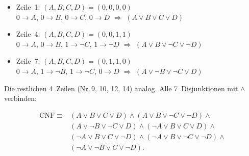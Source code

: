 \documentclass[a4paper,12pt]{article}
\begin{document}
\begin{itemize}[nosep]
\item Zeile~1: $(A,B,C,D) = (0,0,0,0)$\\
      $0 \to A$,\; $0 \to B$,\;
      $0 \to C$,\; $0 \to D$
      \;$\Rightarrow$\; $(A \vee B \vee C \vee D)$
\item Zeile~4: $(A,B,C,D) = (0,0,1,1)$\\
      $0 \to A$,\; $0 \to B$,\;
      $1 \to \neg C$,\; $1 \to \neg D$
      \;$\Rightarrow$\; $(A \vee B \vee \neg C \vee \neg D)$
\item Zeile~7: $(A,B,C,D) = (0,1,1,0)$\\
      $0 \to A$,\; $1 \to \neg B$,\;
      $1 \to \neg C$,\; $0 \to D$
      \;$\Rightarrow$\; $(A \vee \neg B \vee \neg C \vee D)$
\end{itemize}

Die restlichen 4~Zeilen (Nr.\,9, 10, 12, 14) analog.
Alle 7~Disjunktionen mit $\wedge$ verbinden:

\begin{align*}
\text{CNF} \;\equiv\; &(A \vee B \vee C \vee D) \wedge
(A \vee B \vee \neg C \vee \neg D) \wedge {} \\
& (A \vee \neg B \vee \neg C \vee D) \wedge
(\neg A \vee B \vee C \vee D) \wedge {} \\
& (\neg A \vee B \vee C \vee \neg D) \wedge
(\neg A \vee B \vee \neg C \vee \neg D) \wedge {} \\
& (\neg A \vee \neg B \vee C \vee \neg D).
\end{align*}
\end{document}
